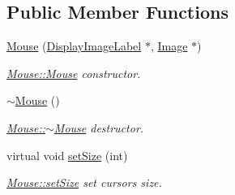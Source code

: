 \subsection*{Public Member Functions}
\begin{DoxyCompactItemize}
\item 
\mbox{\hyperlink{class_mouse_a0b9f53479872fe8bb342632d354fb46e}{Mouse}} (\mbox{\hyperlink{class_display_image_label}{Display\+Image\+Label}} $\ast$, \mbox{\hyperlink{class_image}{Image}} $\ast$)
\begin{DoxyCompactList}\small\item\em \mbox{\hyperlink{class_mouse_a0b9f53479872fe8bb342632d354fb46e}{Mouse\+::\+Mouse}} constructor. \end{DoxyCompactList}\item 
\mbox{\label{class_mouse_afdf7d8abef29c10be77ead773f964f4f}} 
\mbox{\hyperlink{class_mouse_afdf7d8abef29c10be77ead773f964f4f}{$\sim$\+Mouse}} ()
\begin{DoxyCompactList}\small\item\em \mbox{\hyperlink{class_mouse_afdf7d8abef29c10be77ead773f964f4f}{Mouse\+::$\sim$\+Mouse}} destructor. \end{DoxyCompactList}\item 
virtual void \mbox{\hyperlink{class_mouse_adac1d60637770e2739f06ac6f1f88b7b}{set\+Size}} (int)
\begin{DoxyCompactList}\small\item\em \mbox{\hyperlink{class_mouse_adac1d60637770e2739f06ac6f1f88b7b}{Mouse\+::set\+Size}} set cursor\textquotesingle{}s size. \end{DoxyCompactList}\end{DoxyCompactItemize}
